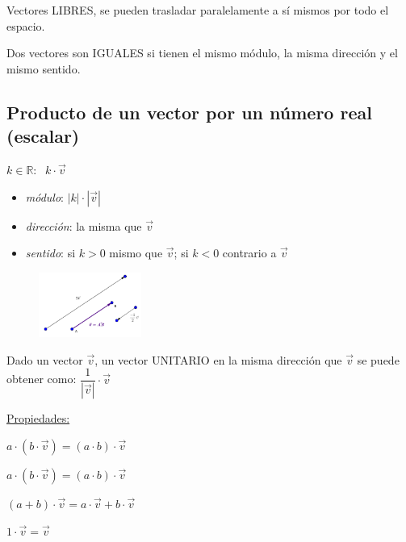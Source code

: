 Vectores LIBRES, se pueden trasladar paralelamente a sí mismos por todo el espacio.
				
Dos vectores son IGUALES si tienen el mismo módulo, la misma dirección y el mismo sentido.

\subsection{Producto de un vector por un número real (escalar)}

$k \in \mathbb{R}$: $\ \ k\cdot \vec v$
\begin{multicols}{2}				
\begin{itemize}
	\item \textit{módulo}: $|k|\cdot |\vec v|$
	\vspace{-2mm}\item \textit{dirección}: la misma que $\vec v$
	\vspace{-2mm}\item \textit{sentido}: si $k>0$ mismo que $\vec v$; si $k<0$ contrario a $\vec v$
\end{itemize} 
\begin{figure}[H]
		\centering
		\includegraphics[width=0.3\textwidth]{imagenes/imagenes10/T10IM02.png}
\end{figure}
\end{multicols}


Dado un vector $\vec v$, un vector UNITARIO en la misma dirección que $\vec v$ se puede obtener como: $\dfrac 1 {|\vec v|}\cdot \vec v$

\vspace{4mm}

\underline{Propiedades:} 

\begin{itemize}
\begin{multicols}{2}
	\item $a\cdot (b\cdot \vec v)=(a\cdot b)\cdot \vec v$ 
	\item  $a\cdot (b\cdot \vec v)=(a\cdot b)\cdot \vec v$ 
	\item $(a+b)\cdot \vec v=a\cdot \vec v+ b\cdot \vec v  $
	\item $1\cdot \vec v=\vec v$
\end{multicols}
\end{itemize}

